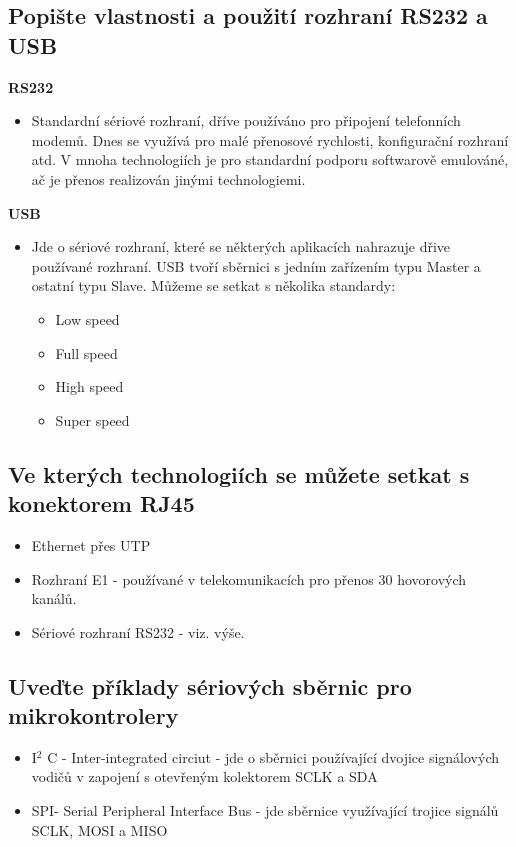 \subsection{Popište vlastnosti a použití rozhraní RS232 a USB}
\textbf{RS232}
\begin{itemize}
    \item Standardní sériové rozhraní, dříve používáno pro připojení telefonních modemů.
    Dnes se využívá pro malé přenosové rychlosti, konfigurační rozhraní atd.
    V mnoha technologiích je pro standardní podporu softwarově emulováné, ač je přenos realizován jinými technologiemi.
\end{itemize}
\textbf{USB}
\begin{itemize}
    \item Jde o sériové rozhraní, které se některých aplikacích nahrazuje dřive používané rozhraní.
    USB tvoří sběrnici s jedním zařízením typu Master a ostatní typu Slave.
    Můžeme se setkat s několika standardy:
\begin{itemize}
    \item Low speed
    \item Full speed
    \item High speed
    \item Super speed
\end{itemize}
\end{itemize}
\subsection{Ve kterých technologiích se můžete setkat s konektorem RJ45}
\begin{itemize}
    \item Ethernet přes UTP
    \item Rozhraní E1 - používané v telekomunikacích pro přenos 30 hovorových kanálů.
    \item Sériové rozhraní RS232 - viz. výše.
\end{itemize}
\subsection{Uveďte příklady sériových sběrnic pro mikrokontrolery}
\begin{itemize}
    \item I$^2$ C - Inter-integrated circiut - jde o sběrnici používající dvojice signálových vodičů v zapojení s otevřeným kolektorem SCLK a SDA
    \item SPI- Serial Peripheral Interface Bus - jde sběrnice využívající trojice signálů SCLK, MOSI a MISO
\end{itemize}
